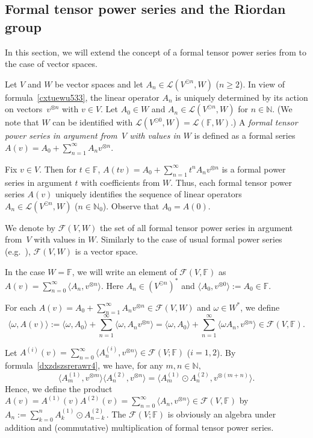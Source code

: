 \documentclass[12pt]{article}
\theoremstyle{remark}
\theoremstyle{remark}
\theoremstyle{remark}
\begin{document}
\subsection{Formal tensor power series and the Riordan group}\label{cftxsdrszresrtes}

In this section, we will extend the concept of a formal tensor power series from \cite{FKLO,FLO}   to the case of vector spaces. 

Let $V$ and $W$ be vector spaces and let $A_n\in\mathcal L(V^{\odot n},W)$ ($n\ge2$). In view of formula~\eqref{cxtuewu533}, the linear operator $A_n$ is uniquely determined by its action on vectors~$v^{\otimes n}$ with $v\in V$. Let $A_0\in W$ and $A_n\in\mathcal L(V^{\odot n},W)$ for $n\in\mathbb N$. (We note that $W$ can be identified with $\mathcal L(V^{\odot 0},W)=\mathcal L(\mathbb F,W)$.) A {\it formal tensor power series in argument from~$V$ with values in $W$} is defined  as a formal series $A(v)=A_0+\sum_{n=1}^\infty A_nv^{\otimes n}$. 

Fix $v\in V$. Then for $t\in\mathbb F$, $A(tv)=A_0+\sum_{n=1}^\infty t^n A_nv^{\otimes n}$ is a formal power series in argument $t$ with coefficients from $W$.  Thus, each formal tensor power series $A(v)$ uniquely identifies the sequence of linear operators $A_n\in\mathcal L(V^{\odot n},W)$ ($n\in\mathbb N_0$). Observe that $A_0=A(0)$. 

 We denote by $\mathcal F(V,W)$ the set of all formal tensor power series in argument from~$V$ with values in $W$. Similarly to the case of usual formal power series (e.g.\ \cite[Chapter~1, Section~2]{Roman}), $\mathcal F(V,W)$  is a vector space.  

 

In the case  $W=\mathbb F$, we will write an element of $\mathcal F(V,\mathbb F)$ as $A(v)=\sum_{n=0}^\infty\langle A_n,v^{\otimes n}\rangle$. Here $A_n\in(V^{\odot n})^*$ and $\langle A_0,v^{\otimes 0}\rangle:=A_0\in\mathbb F$. 

For each $A(v)=A_0+\sum_{n=1}^\infty A_nv^{\otimes n}\in\mathcal F(V,W)$ and $\omega\in W^*$, we define 
$$\langle\omega,A(v)\rangle:=\langle\omega,A_0\rangle+\sum_{n=1}^\infty\langle\omega, A_nv^{\otimes n}\rangle=\langle\omega,A_0\rangle+\sum_{n=1}^\infty \langle \omega A_n,v^{\otimes n}\rangle\in\mathcal F(V,\mathbb F).$$ 

Let $A^{(i)}(v)=\sum_{n=0}^\infty\langle A_n^{(i)},v^{\otimes n}\rangle\in \mathcal F(V;\mathbb F)$ ($i=1,2$). By formula~\eqref{dxzdszsrerawr4}, 
we have, for any $m,n\in\mathbb N$, 
\begin{equation}\label{vcytdy}
\langle A_m^{(1)},v^{\otimes m}\rangle\langle A_n^{(2)},v^{\otimes n}\rangle=\langle A_m^{(1)}\odot A_n^{(2)},v^{\otimes(m+n)}\rangle.
\end{equation} 
Hence, we define the product $A(v)=A^{(1)}(v)A^{(2)}(v)=\sum_{n=0}^\infty \langle A_n,v^{\otimes n}\rangle\in \mathcal F(V,\mathbb F)$ by 
$A_n:=\sum_{k=0}^n A^{(1)}_k\odot A^{(2)}_{n-k}$\,. The $\mathcal F(V;\mathbb{F})$ is obviously an algebra under addition and (commutative) multiplication of formal tensor power series.
\end{document}
